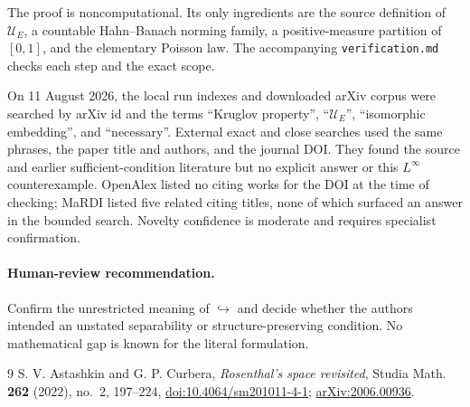 \documentclass[11pt]{article}
\newcommand{\U}{\mathcal U}
\newcommand{\subsetsim}{\mathrel{\hookrightarrow}}
\begin{document}
The proof is noncomputational. Its only ingredients are the source definition
of $\U_E$, a countable Hahn--Banach norming family, a positive-measure
partition of $[0,1]$, and the elementary Poisson law. The accompanying
\texttt{verification.md} checks each step and the exact scope.

On 11 August 2026, the local run indexes and downloaded arXiv corpus were
searched by arXiv id and the terms ``Kruglov property'', ``$\U_E$'',
``isomorphic embedding'', and ``necessary''. External exact and close
searches used the same phrases, the paper title and authors, and the journal
DOI. They found the source and earlier sufficient-condition literature but no
explicit answer or this $L^\infty$ counterexample. OpenAlex listed no citing
works for the DOI at the time of checking; MaRDI listed five related citing
titles, none of which surfaced an answer in the bounded search. Novelty
confidence is moderate and requires specialist confirmation.

\paragraph{Human-review recommendation.}
Confirm the unrestricted meaning of $\subsetsim$ and decide whether the
authors intended an unstated separability or structure-preserving condition.
No mathematical gap is known for the literal formulation.

\begin{thebibliography}{9}
S. V. Astashkin and G. P. Curbera,
\emph{Rosenthal's space revisited},
Studia Math. \textbf{262} (2022), no.~2, 197--224,
\href{https://doi.org/10.4064/sm201011-4-1}{doi:10.4064/sm201011-4-1};
\href{https://arxiv.org/abs/2006.00936}{arXiv:2006.00936}.
\end{thebibliography}
\end{document}
